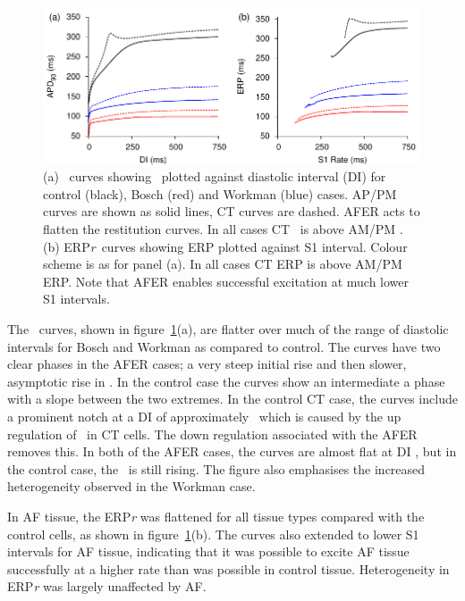 \begin{figure}
\centering
\includegraphics{figures/toolkit/afer/figures/02_APDR}
\caption[AFER APDr and ERPr curves]{
\label{fig:toolkit:afer:apdr}
(a)
\apdr\ curves showing \apd\ plotted against diastolic interval (DI) for control
(black), Bosch (red) and Workman (blue) cases.
AP/PM curves are shown as solid lines, CT curves are dashed.
AFER acts to flatten the restitution curves.
In all cases CT \apd\ is above AM/PM \apd.
(b)
ERP\emph{r}\ curves showing ERP plotted against S1 interval.
Colour scheme is as for panel (a).
In all cases CT ERP is above AM/PM ERP.
Note that AFER enables successful excitation at much lower S1 intervals.
}
\end{figure}

The \apdr\ curves, shown in figure~\ref{fig:toolkit:afer:apdr}(a), are
flatter over much of the range of diastolic intervals for Bosch and Workman as
compared to control.
The curves have two clear phases in the AFER cases; a very steep initial rise
and then slower, asymptotic rise in \apd.
In the control case the curves show an intermediate a phase with a slope between
the two extremes.
In the control CT case, the curves include a prominent notch at a DI of
approximately \ which is caused by the up regulation of \ in CT
cells.
The down regulation associated with the AFER removes this.
In both of the AFER cases, the curves are almost flat at DI , but in the
control case, the \apd\ is still rising.
The figure also emphasises the increased heterogeneity observed in the Workman
case.

In AF tissue, the ERP\emph{r} was flattened for all tissue types compared with
the control cells, as shown in figure~\ref{fig:toolkit:afer:apdr}(b).
The curves also extended to lower S1 intervals for AF tissue, indicating that it
was possible to excite AF tissue successfully at a higher rate than was possible
in control tissue.
Heterogeneity in ERP\emph{r} was largely unaffected by AF.

